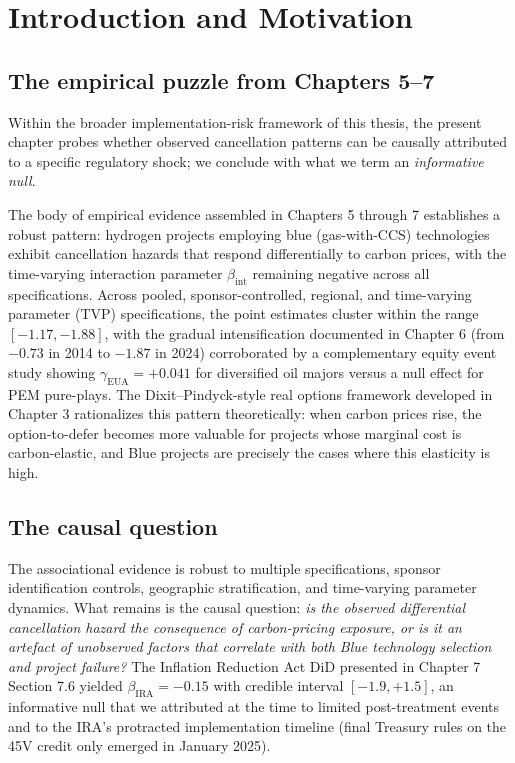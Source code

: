 \documentclass[11pt,a4paper]{article}
\newcommand{\bint}{\beta_{\mathrm{int}}}
\begin{document}
\tableofcontents
\newpage

\section{Introduction and Motivation}
\label{sec:ch8-intro}

\subsection{The empirical puzzle from Chapters 5--7} Within the broader implementation-risk framework of this thesis, the present chapter probes whether observed cancellation patterns can be causally attributed to a specific regulatory shock; we conclude with what we term an \textit{informative null}.

The body of empirical evidence assembled in Chapters 5 through 7 establishes a robust pattern: hydrogen projects employing blue (gas-with-CCS) technologies exhibit cancellation hazards that respond differentially to carbon prices, with the time-varying interaction parameter $\bint$ remaining negative across all specifications. Across pooled, sponsor-controlled, regional, and time-varying parameter (TVP) specifications, the point estimates cluster within the range $[-1.17, -1.88]$, with the gradual intensification documented in Chapter 6 (from $-0.73$ in 2014 to $-1.87$ in 2024) corroborated by a complementary equity event study showing $\gamma_{\mathrm{EUA}} = +0.041$ for diversified oil majors versus a null effect for PEM pure-plays. The Dixit--Pindyck-style real options framework developed in Chapter 3 rationalizes this pattern theoretically: when carbon prices rise, the option-to-defer becomes more valuable for projects whose marginal cost is carbon-elastic, and Blue projects are precisely the cases where this elasticity is high.

\subsection{The causal question}

The associational evidence is robust to multiple specifications, sponsor identification controls, geographic stratification, and time-varying parameter dynamics. What remains is the causal question: \emph{is the observed differential cancellation hazard the consequence of carbon-pricing exposure, or is it an artefact of unobserved factors that correlate with both Blue technology selection and project failure?} The Inflation Reduction Act DiD presented in Chapter 7 Section 7.6 yielded $\beta_{\mathrm{IRA}} = -0.15$ with credible interval $[-1.9, +1.5]$, an informative null that we attributed at the time to limited post-treatment events and to the IRA's protracted implementation timeline (final Treasury rules on the 45V credit only emerged in January 2025).
\end{document}
